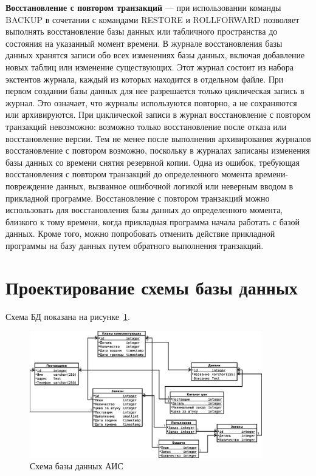 \documentclass[russian,utf8,emptystyle]{eskdtext}
\begin{document}
\textbf{Восстановление с повтором транзакций} — при использовании команды BACKUP в сочетании с командами RESTORE и ROLLFORWARD позволяет выполнять восстановление базы данных или табличного пространства до состояния на указанный момент времени. В журнале восстановления базы данных хранятся записи обо всех изменениях базы данных, включая добавление новых таблиц или изменение существующих. Этот журнал состоит из набора экстентов журнала, каждый из которых находится в отдельном файле. При первом создании базы данных для нее разрешается только циклическая запись в журнал. Это означает, что журналы используются повторно, а не сохраняются или архивируются. При циклической записи в журнал восстановление с повтором транзакций невозможно: возможно только восстановление после отказа или восстановление версии. Тем не менее после выполнения архивирования журналов восстановление с повтором возможно, поскольку в журналах записаны изменения базы данных со времени снятия резервной копии. Одна из ошибок, требующая восстановления с повтором транзакций до определенного момента времени-повреждение данных, вызванное ошибочной логикой или неверным вводом в прикладной программе. Восстановление с повтором транзакций можно использовать для восстановления базы данных до определенного момента, близкого к тому времени, когда прикладная программа начала работать с базой данных. Кроме того, можно попробовать отменить действие прикладной программы на базу данных путем обратного выполнения транзакций.

\clearpage
\section{Проектирование схемы базы данных}

Схема БД показана на рисунке~\ref{fig:bd-1}.

\begin{figure}[h!]
\centering
\includegraphics[width=0.9\textwidth]{bd}
\caption{Схема базы данных АИС}
\label{fig:bd-1}
\end{figure}
\end{document}
